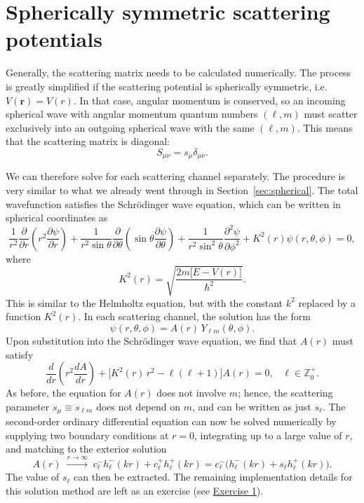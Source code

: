 \documentclass[pra,12pt]{revtex4}
\begin{document}
\section{Spherically symmetric scattering potentials}

Generally, the scattering matrix needs to be calculated numerically.
The process is greatly simplified if the scattering potential is
spherically symmetric, i.e.~$V(\mathbf{r}) = V(r)$.  In that case,
angular momentum is conserved, so an incoming spherical wave with
angular momentum quantum numbers $(\ell,m)$ must scatter exclusively
into an outgoing spherical wave with the same $(\ell,m)$.  This means
that the scattering matrix is diagonal:
$$S_{\mu \nu} = s_\mu \delta_{\mu\nu}.$$

We can therefore solve for each scattering channel separately.  The
procedure is very similar to what we already went through in
Section~\ref{sec:spherical}.  The total wavefunction satisfies the
Schr\"odinger wave equation, which can be written in spherical
coordinates as
$$\frac{1}{r^2}\frac{\partial}{\partial r}\left(r^2\frac{\partial \psi}{\partial r}\right) + \frac{1}{r^2\sin\theta}\frac{\partial}{\partial\theta}\left(\sin\theta\frac{\partial\psi}{\partial\theta}\right)+\frac{1}{r^2\sin^2\theta}\frac{\partial^2\psi}{\partial\phi^2} + K^2(r) \psi(r,\theta,\phi) = 0,$$
where
$$K^2(r) = \sqrt{\frac{2m\big[E-V(r)\big]}{\hbar^2}}.$$
This is similar to the Helmholtz equation, but with the constant $k^2$
replaced by a function $K^2(r)$.  In each scattering channel, the
solution has the form
$$\psi(r,\theta,\phi) = A(r) \, Y_{\ell m}(\theta, \phi).$$
Upon substitution into the Schr\"odinger wave equation, we find that
$A(r)$ must satisfy
$$\frac{d}{dr}\left(r^2\frac{dA}{dr}\right) + \Big[K^2(r)\, r^2 - \ell(\ell+1)\Big] A(r) = 0, \;\;\;\ell \in \mathbb{Z}_0^+.$$
As before, the equation for $A(r)$ does not involve $m$; hence, the
scattering parameter $s_\mu \equiv s_{\ell m}$ does not depend on $m$,
and can be written as just $s_\ell$.  The second-order ordinary
differential equation can now be solved numerically by supplying two
boundary conditions at $r=0$, integrating up to a large value of $r$,
and matching to the exterior solution
$$A(r) \; \overset{r\rightarrow\infty}{\longrightarrow} \; c^-_\ell h^-_\ell(kr) + c^+_\ell h^+_\ell(kr) = c^-_\ell \Big(h^-_\ell(kr) + s_\ell h^+_\ell(kr)\Big).$$
The value of $s_\ell$ can then be extracted.  The remaining
implementation details for this solution method are left as an
exercise (see \hyperref[ex:numerical_spherical]{Exercise 1}).
\end{document}
